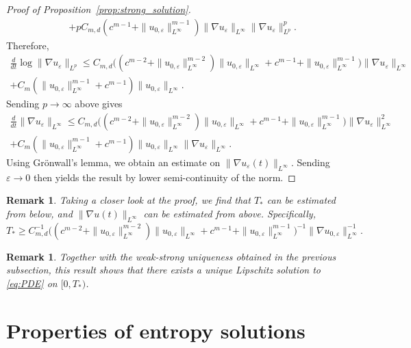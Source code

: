 \documentclass[11pt]{article}
\newtheorem{remark}[thm]{Remark}
\numberwithin{equation}{section} %
\newcommand{\eps}{\varepsilon}
\newcommand{\ep}{\varepsilon}
\def \ep{\varepsilon}
\def\nab{\nabla}
\begin{document}
\begin{proof}[Proof of Proposition~\ref{prop:strong_solution}]
\begin{align*}
        & + pC_{m,d} (c^{m-1}+\| u_{0,\ep}\|_{L^\infty}^{m-1}) \|\nab u_\ep\|_{L^\infty} \|\nab u_\ep\|_{L^p}^p. 
    \end{align*}
    Therefore, 
    \begin{multline*}
        \frac{d}{dt}\log \|\nab u_\ep\|_{L^p} \le C_{m,d} \big((c^{m-2}+\|u_{0,\ep}\|_{L^\infty}^{m-2})\|u_{0,\ep}\|_{L^\infty} + c^{m-1}+\|u_{0,\ep}\|_{L^\infty}^{m-1} \big) \|\nab u_\ep\|_{L^\infty} \\
        + C_m (\| u_{0,\ep}\|_{L^\infty}^{m-1}+c^{m-1}) \| u_{0,\ep}\|_{L^\infty }.
    \end{multline*}
    Sending $p\to\infty$ above gives
    \begin{multline*}
        \frac{d}{dt}\| \nab u_\ep\|_{L^\infty}\le C_{m,d} \big((c^{m-2}+\|u_{0,\ep}\|_{L^\infty}^{m-2})\|u_{0,\ep}\|_{L^\infty} + c^{m-1}+\|u_{0,\ep}\|_{L^\infty}^{m-1} \big) \|\nab u_\ep\|_{L^\infty}^2 \\
        + C_m (\| u_{0,\ep}\|_{L^\infty}^{m-1}+c^{m-1}) \| u_{0,\ep}\|_{L^\infty }\|\nab u_\ep\|_{L^\infty}.
    \end{multline*}
Using Gr\"onwall's lemma, we obtain an estimate on $\|\nabla u_{\eps}(t)\|_{L^{\infty}}$. Sending $\varepsilon\to 0$ then yields the result by lower semi-continuity of the norm. 
\end{proof}


\begin{remark}
Taking a closer look at the proof, we find that $T_*$ can be estimated from below, and $\|\nabla u(t)\|_{L^{\infty}}$ can be estimated from above. Specifically,
 \begin{equation*}
    T_*\ge C_{m,d}^{-1} \big((c^{m-2}+\|u_{0,\ep}\|_{L^\infty}^{m-2})\|u_{0,\ep}\|_{L^\infty} + c^{m-1}+\|u_{0,\ep}\|_{L^\infty}^{m-1} \big)^{-1}\| \nab u_{0,\ep} \|_{L^\infty}^{-1}.
\end{equation*}  
\end{remark}


\begin{remark}
    Together with the weak-strong uniqueness obtained in the previous subsection, this result shows that there exists a unique Lipschitz solution to \eqref{eq:PDE} on $[0,T_*)$.
\end{remark}

\section{Properties of entropy solutions}
\end{document}
